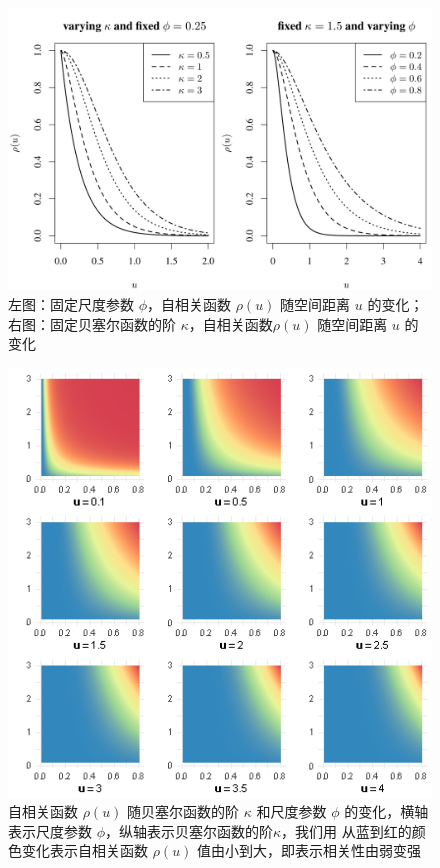 \documentclass[12pt,a4paper,UTF8,twoside]{book}
\theoremstyle{definition}
\theoremstyle{definition}
\theoremstyle{definition}
\theoremstyle{remark}
\begin{document}
\begin{figure}

{\centering \includegraphics[width=0.8\linewidth]{figures/matern} 

}

\caption{左图：固定尺度参数 $\phi$，自相关函数 $\rho(u)$ 随空间距离 $u$ 的变化；右图：固定贝塞尔函数的阶 $\kappa$，自相关函数$\rho(u)$ 随空间距离 $u$ 的变化}\label{fig:matern-2d}
\end{figure}
\begin{figure}

{\centering \includegraphics[width=0.8\linewidth]{figures/matern-3d} 

}

\caption{自相关函数 $\rho(u)$ 随贝塞尔函数的阶 $\kappa$ 和尺度参数 $\phi$ 的变化，横轴表示尺度参数 $\phi$，纵轴表示贝塞尔函数的阶$\kappa$，我们用 从蓝到红的颜色变化表示自相关函数 $\rho(u)$ 值由小到大，即表示相关性由弱变强}\label{fig:matern-3d}
\end{figure}
\end{document}
